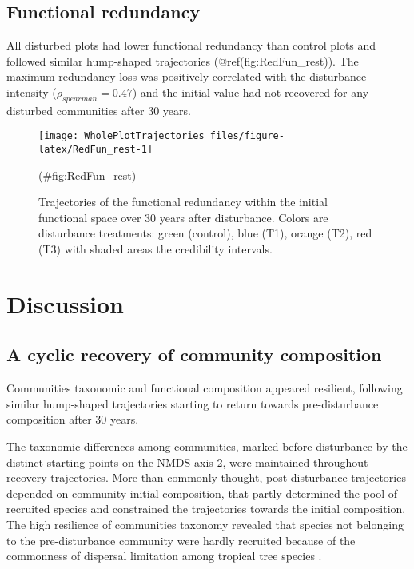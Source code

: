 \documentclass[fleqn,10pt]{ArtEcoFoG} %
\begin{document}
\subsection{Functional redundancy}\label{functional-redundancy}

All disturbed plots had lower functional redundancy than control plots
and followed similar hump-shaped trajectories (@ref(fig:RedFun\_rest)).
The maximum redundancy loss was positively correlated with the
disturbance intensity (\(\rho_{spearman}=0.47\)) and the initial value
had not recovered for any disturbed communities after 30 years.

\begin{figure}

{\centering \texttt{[image: WholePlotTrajectories\_files/figure-latex/RedFun\_rest-1]} 

}

\caption{Trajectories of the functional redundancy within the initial functional space over 30 years after disturbance. Colors are disturbance treatments: green (control), blue (T1), orange (T2), red (T3) with shaded areas the credibility intervals.}(\#fig:RedFun_rest)
\end{figure}

\section{Discussion}\label{discussion}

\subsection{A cyclic recovery of community
composition}\label{a-cyclic-recovery-of-community-composition}

Communities taxonomic and functional composition appeared resilient,
following similar hump-shaped trajectories starting to return towards
pre-disturbance composition after 30 years.

The taxonomic differences among communities, marked before disturbance
by the distinct starting points on the NMDS axis 2, were maintained
throughout recovery trajectories. More than commonly thought,
post-disturbance trajectories depended on community initial composition,
that partly determined the pool of recruited species and constrained the
trajectories towards the initial composition. The high resilience of
communities taxonomy revealed that species not belonging to the
pre-disturbance community were hardly recruited because of the
commonness of dispersal limitation among tropical tree species
\citep{Svenning2005}.
\end{document}
